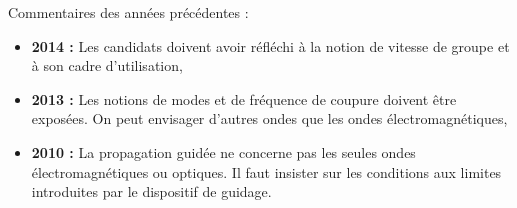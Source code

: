 \begin{reportBlock}{Commentaires des années précédentes :}
    \begin{itemize}
        \item \textbf{2014 :} Les candidats doivent avoir réfléchi à la notion de vitesse de groupe et à son cadre d’utilisation,
        \item \textbf{2013 :} Les notions de modes et de fréquence de coupure doivent être exposées. On peut envisager d’autres ondes que les ondes électromagnétiques,
        \item \textbf{2010 :} La propagation guidée ne concerne pas les seules ondes électromagnétiques ou optiques. Il faut insister sur les conditions aux limites introduites par le dispositif de guidage.
    \end{itemize}
\end{reportBlock}
